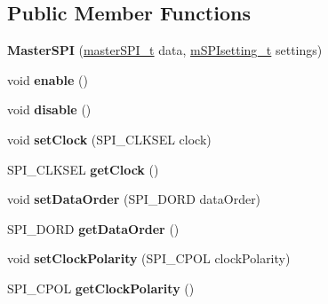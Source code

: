 \subsection*{Public Member Functions}
\begin{DoxyCompactItemize}
\item 
\mbox{\label{classMasterSPI_abfc56edf4c6f5c60d8f55f4c4a579c75}} 
{\bfseries Master\+S\+PI} (\mbox{\hyperlink{structmasterSPI__t}{master\+S\+P\+I\+\_\+t}} data, \mbox{\hyperlink{structmSPIsetting__t}{m\+S\+P\+Isetting\+\_\+t}} settings)
\item 
\mbox{\label{classMasterSPI_a1e141d3c600973a7fbc20295fd848166}} 
void {\bfseries enable} ()
\item 
\mbox{\label{classMasterSPI_adae97af990eca4566cec849cb39dd0fc}} 
void {\bfseries disable} ()
\item 
\mbox{\label{classMasterSPI_a9bdb983b346cc4b03eac1ef30dfc8686}} 
void {\bfseries set\+Clock} (S\+P\+I\+\_\+\+C\+L\+K\+S\+EL clock)
\item 
\mbox{\label{classMasterSPI_a21f2d0bfe737d96f628bd70ea7b6514d}} 
S\+P\+I\+\_\+\+C\+L\+K\+S\+EL {\bfseries get\+Clock} ()
\item 
\mbox{\label{classMasterSPI_a566f067a1e45eea6705d0973c4cf8862}} 
void {\bfseries set\+Data\+Order} (S\+P\+I\+\_\+\+D\+O\+RD data\+Order)
\item 
\mbox{\label{classMasterSPI_af65dc8e666dacce098002f25d8154e4b}} 
S\+P\+I\+\_\+\+D\+O\+RD {\bfseries get\+Data\+Order} ()
\item 
\mbox{\label{classMasterSPI_a7bd208fd11af5254a31acd9ac17aedcf}} 
void {\bfseries set\+Clock\+Polarity} (S\+P\+I\+\_\+\+C\+P\+OL clock\+Polarity)
\item 
\mbox{\label{classMasterSPI_abe36df23759ef1ac4ceabf8beb0c87e1}} 
S\+P\+I\+\_\+\+C\+P\+OL {\bfseries get\+Clock\+Polarity} ()
\item 
\mbox{\label{classMasterSPI_af62130860321f5d56dbef942ed4dd976}} 

\end{DoxyCompactItemize}
